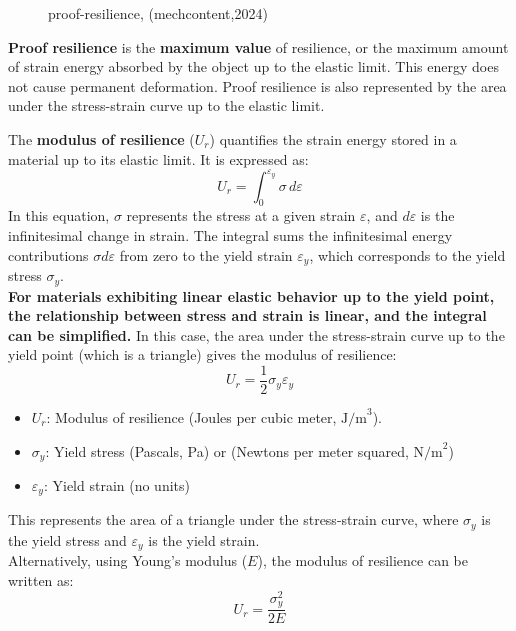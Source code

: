 \documentclass{article}
\begin{document}
\begin{center}
\begin{minipage}[t]{0.46\textwidth}
\begin{figure}[H]
    \caption{proof-resilience, (mechcontent,2024)}
    \label{fig:proof-resilience}
\end{figure}
\textbf{Proof resilience} is the \textbf{maximum value} of resilience, or the maximum amount of strain energy absorbed by the object up to the elastic limit. This energy does not cause permanent deformation. Proof resilience is also represented by the area under the stress-strain curve up to the elastic limit.
\end{minipage}

\end{center}

The \textbf{modulus of resilience} ($U_r$) quantifies the strain energy stored in a material up to its elastic limit. It is expressed as:
\begin{equation}
    U_r = \int_0^{\varepsilon_y} \sigma \, d\varepsilon
\end{equation}
In this equation, $\sigma$ represents the stress at a given strain $\varepsilon$, and $d\varepsilon$ is the infinitesimal change in strain. The integral sums the infinitesimal energy contributions $\sigma d\varepsilon$ from zero to the yield strain $\varepsilon_y$, which corresponds to the yield stress $\sigma_y$.\\[8pt]
\textbf{For materials exhibiting linear elastic behavior up to the yield point, the relationship between stress and strain is linear, and the integral can be simplified.} In this case, the area under the stress-strain curve up to the yield point (which is a triangle) gives the modulus of resilience:
\begin{equation}
    U_r = \frac{1}{2} \sigma_y \varepsilon_y
\end{equation}
\begin{itemize}[itemsep=-1mm]
    \item \(U_r\): Modulus of resilience (Joules per cubic meter, \( \text{J/m}^3 \)).
    \item \( \sigma_y \): {Yield stress} (Pascals, Pa) or (Newtons per meter squared, \( \text{N/m}^2 \))
    \item \( \varepsilon_y \): {Yield strain} (no units)
\end{itemize}
This represents the area of a triangle under the stress-strain curve, where \( \sigma_y \) is the yield stress and \( \varepsilon_y \) is the yield strain.\\[8pt]
Alternatively, using Young's modulus (\( E \)), the modulus of resilience can be written as:
\begin{equation}
    U_r = \frac{\sigma_y^2}{2E}
\end{equation}
\end{document}
